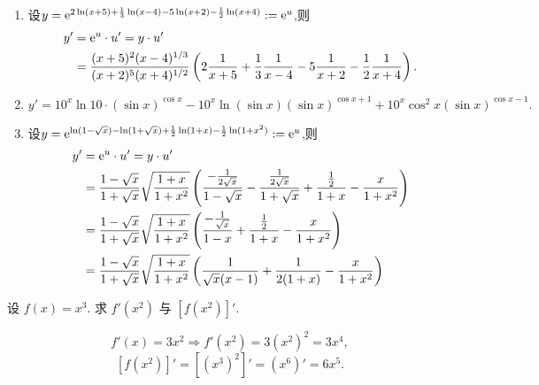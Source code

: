 \begin{solution}
\begin{enumerate}
        \item 设$y = \mathrm{e}^{2 \ln (x+5) + \frac{1}{3} \ln (x-4) - 5 \ln (x+2) - \frac{1}{2} \ln (x+4)} := \mathrm{e}^u$,则
              \begin{align*}
                  y' & = \mathrm{e}^u \cdot u'  = y \cdot u'                                                                                                                                    \\
                     & = \dfrac{(x+5)^2(x-4)^{1/3}}{(x+2)^5(x+4)^{1/2}} \left( 2 \dfrac{1}{x+5} + \dfrac{1}{3} \dfrac{1}{x-4} - 5 \dfrac{1}{x+2} - \dfrac{1}{2} \dfrac{1}{x+4} \right).
              \end{align*}
        \item $$y' =  10^x \ln 10\cdot ( \sin x)^{\cos x} - 10^x \ln(\sin x) (\sin x)^{\cos x+1} + 10^x \cos^2 x (\sin x)^{\cos x - 1}.$$
        \item 设$y = \mathrm{e}^{\ln (1-\sqrt{x}) - \ln (1+\sqrt{x}) + \frac{1}{2} \ln (1+x) - \frac{1}{2} \ln (1+x^2)} := \mathrm{e}^u$,则
              \begin{align*}
                  y' & = \mathrm{e}^u \cdot u' = y \cdot u'                                                                                                                                                                         \\
                     & = \frac{1-\sqrt{x}}{1+\sqrt{x}} \sqrt{\frac{1+x}{1+x^2}} \left( \frac{-\frac{1}{2\sqrt{x}}}{1-\sqrt{x}} - \frac{\frac{1}{2\sqrt{x}}}{1+\sqrt{x}} + \frac{\frac{1}{2}}{1+x} - \frac{x}{1+x^2} \right) \\
                     & = \frac{1-\sqrt{x}}{1+\sqrt{x}} \sqrt{\frac{1+x}{1+x^2}} \left( \frac{-\frac{1}{\sqrt x}}{1-x} + \frac{\frac12}{1+x} - \frac{x}{1+x^2} \right)                                                       \\
                     & = \frac{1-\sqrt{x}}{1+\sqrt{x}} \sqrt{\frac{1+x}{1+x^2}} \left( \frac{1}{\sqrt{x}(x-1)} + \frac{1}{2(1+x)} - \frac{x}{1+x^2} \right)
              \end{align*}
    \end{enumerate}
\end{solution}

\begin{exercise}[3.1.8]
    设 $f(x)=x^3$. 求 $f'(x^2)$ 与 $[f(x^2)]'$.
\end{exercise}

\begin{solution}
    $$f'(x) = 3x^2 \Rightarrow f'(x^2) = 3 (x^2)^2 = 3x^4,$$
    $$[f(x^2)]' = [(x^3)^2]' = (x^6)' = 6x^5.$$
\end{solution}

